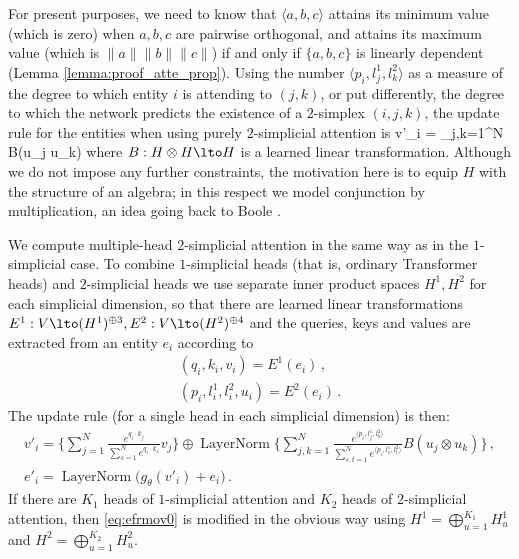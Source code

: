 \documentclass{article} %
\begin{document}
For present purposes, we need to know that $\langle a, b, c \rangle$ attains its minimum value (which is zero) when $a,b,c$ are pairwise orthogonal, and attains its maximum value (which is $\| a \| \| b \| \| c \|$) if and only if $\{ a, b, c \}$ is linearly dependent (Lemma \ref{lemma:proof_atte_prop}). Using the number $\langle p_i, l^1_j, l^2_k \rangle$ as a measure of the degree to which entity $i$ is attending to $(j,k)$, or put differently, the degree to which the network predicts the existence of a $2$-simplex $(i,j,k)$, the update rule for the entities when using purely $2$-simplicial attention is
\be\label{eq:Bformula}
v'_i = \sum_{j,k=1}^N  B(u_j \otimes u_k)
\ee
where $B: H \otimes H \lto H$ is a learned linear transformation. Although we do not impose any further constraints, the motivation here is to equip $H$ with the structure of an algebra; in this respect we model conjunction by multiplication, an idea going back to Boole \citep{boole}. 

We compute multiple-head $2$-simplicial attention in the same way as in the $1$-simplicial case. To combine $1$-simplicial heads (that is, ordinary Transformer heads) and $2$-simplicial heads we use separate inner product spaces $H^1, H^2$ for each simplicial dimension, so that there are learned linear transformations $E^1 : V \lto (H^1)^{\oplus 3}, E^2 : V \lto (H^2)^{\oplus 4}$ and the queries, keys and values are extracted from an entity $e_i$ according to
\begin{gather*}
(q_i, k_i, v_i) = E^1(e_i)\,,\\
(p_i, l^1_i, l^2_i, u_i) = E^2(e_i)\,.
\end{gather*}
The update rule (for a single head in each simplicial dimension) is then:
\begin{gather}
v'_i = \Big\{ \sum_{j=1}^N \frac{e^{q_i \cdot k_j}}{\sum_{s=1}^N e^{q_i \cdot k_s}} v_j \Big\} \oplus \operatorname{LayerNorm}\Big\{ \sum_{j,k=1}^N \frac{e^{\langle p_i, l^1_j, l^2_k \rangle}}{\sum_{s,t=1}^N e^{\langle p_i, l^1_s, l^2_t \rangle}} B(u_j \otimes u_k) \Big\}\,,\label{eq:efrmov0} \\
e'_i = \operatorname{LayerNorm}\big( g_\theta(v'_i) + e_i \big)\,. \label{eq:efromv}
\end{gather}
If there are $K_1$ heads of $1$-simplicial attention and $K_2$ heads of $2$-simplicial attention, then \eqref{eq:efrmov0} is modified in the obvious way using $H^1 = \bigoplus_{u=1}^{K_1} H^1_u$ and $H^2 = \bigoplus_{u=1}^{K_2} H^2_u$.
\end{document}
